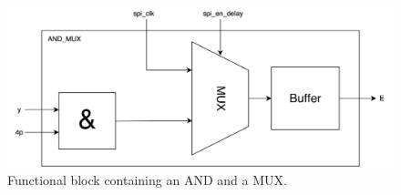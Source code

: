 \begin{figure}[H]
\centering
\captionsetup{justification=centering}
\includegraphics[scale=0.1]{../figures/AND_MUX_ny.png}
\caption{Functional block containing an AND and a MUX.}
\label{and_mux}
\end{figure}




